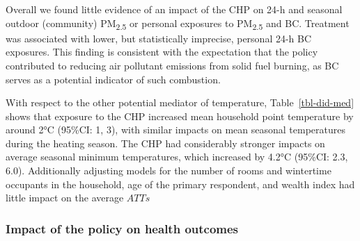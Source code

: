 \documentclass[
  letterpaper,
  DIV=11,
  numbers=noendperiod]{scrartcl}
\begin{document}
Overall we found little evidence of an impact of the CHP on 24-h and
seasonal outdoor (community) PM\textsubscript{2.5} or personal exposures
to PM\textsubscript{2.5} and BC. Treatment was associated with lower,
but statistically imprecise, personal 24-h BC exposures. This finding is
consistent with the expectation that the policy contributed to reducing
air pollutant emissions from solid fuel burning, as BC serves as a
potential indicator of such combustion.

With respect to the other potential mediator of temperature,
Table~\ref{tbl-did-med} shows that exposure to the CHP increased mean
household point temperature by around 2°C (95\%CI: 1, 3), with similar
impacts on mean seasonal temperatures during the heating season. The CHP
had considerably stronger impacts on average seasonal minimum
temperatures, which increased by 4.2°C (95\%CI: 2.3, 6.0). Additionally
adjusting models for the number of rooms and wintertime occupants in the
household, age of the primary respondent, and wealth index had little
impact on the average \(ATTs\)

\subsubsection{Impact of the policy on health
outcomes}\label{impact-of-the-policy-on-health-outcomes}
\end{document}
